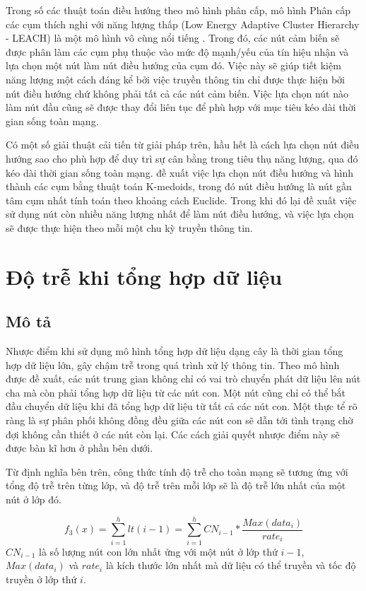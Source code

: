 Trong số các thuật toán điều hướng theo mô hình phân cấp, mô hình Phân cấp các cụm thích nghi với năng lượng thấp (Low Energy Adaptive Cluster Hierarchy - LEACH) là một mô hình vô cùng nổi tiếng \cite{heinzelman2000energy}. Trong đó, các nút cảm biến sẽ được phân làm các cụm phụ thuộc vào mức độ mạnh/yếu của tín hiệu nhận và lựa chọn một nút làm nút điều hướng của cụm đó. Việc này sẽ giúp tiết kiệm năng lượng một cách đáng kể bởi việc truyền thông tin chỉ được thực hiện bởi nút điều hướng chứ không phải tất cả các nút cảm biến. Việc lựa chọn nút nào làm nút đầu cũng sẽ được thay đổi liên tục để phù hợp với mục tiêu kéo dài thời gian sống toàn mạng.


Có một số giải thuật cải tiến từ giải pháp trên, hầu hết là cách lựa chọn nút điều hướng sao cho phù hợp để duy trì sự cân bằng trong tiêu thụ năng lượng, qua đó kéo dài thời gian sống toàn mạng. \cite{bakaraniya2013k} đề xuất việc lựa chọn nút điều hướng và hình thành các cụm bằng thuật toán K-medoids, trong đó nút điều hướng là nút gần tâm cụm nhất tính toán theo khoảng cách Euclide. Trong khi đó \cite{arumugam2015ee} lại đề xuất việc sử dụng nút còn nhiều năng lượng nhất để làm nút điều hướng, và việc lựa chọn sẽ được thực hiện theo mỗi một chu kỳ truyền thông tin.

\section{Độ trễ khi tổng hợp dữ liệu}
\subsection{Mô tả}
Nhược điểm khi sử dụng mô hình tổng hợp dữ liệu dạng cây là thời gian tổng hợp dữ liệu lớn, gây chậm trễ trong quá trình xử lý thông tin. Theo mô hình được đề xuất, các nút trung gian không chỉ có vai trò chuyển phát dữ liệu lên nút cha mà còn phải tổng hợp dữ liệu từ các nút con. Một nút cũng chỉ có thể bắt đầu chuyển dữ liệu khi đã tổng hợp dữ liệu từ tất cả các nút con. Một thực tể rõ ràng là sự phân phối không đồng đều giữa các nút con sẽ dẫn tới tình trạng chờ đợi không cần thiết ở các nút còn lại. Các cách giải quyết nhược điểm này sẽ được bàn kĩ hơn ở phần bên dưới.

Từ định nghĩa bên trên, công thức tính độ trễ cho toàn mạng sẽ tương ứng với tổng độ trễ trên từng lớp, và độ trễ trên mỗi lớp sẽ là độ trễ lớn nhất của một nút ở lớp đó.

\begin{equation}
f_3(x) = \sum_{i=1}^h lt(i-1) = \sum_{i=1}^h CN_{i-1} * \frac{Max(data_i)}{rate_i}
\end{equation}
$CN_{i-1}$ là số lượng nút con lớn nhất ứng với một nút ở lớp thứ $i-1$,  $Max(data_i)$ và $rate_i$ là kích thước lớn nhất mà dữ liệu có thể truyền và tốc độ truyền ở lớp thứ $i$.
